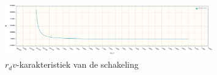 \documentclass{report}
\begin{document}
\begin{figure}[H]
	\centering
	\includegraphics[width=0.8\textwidth]{RdV.png}
	\caption{$r_dv$-karakteristiek van de schakeling}
	\label{fig:rdv}
\end{figure}
\end{document}
